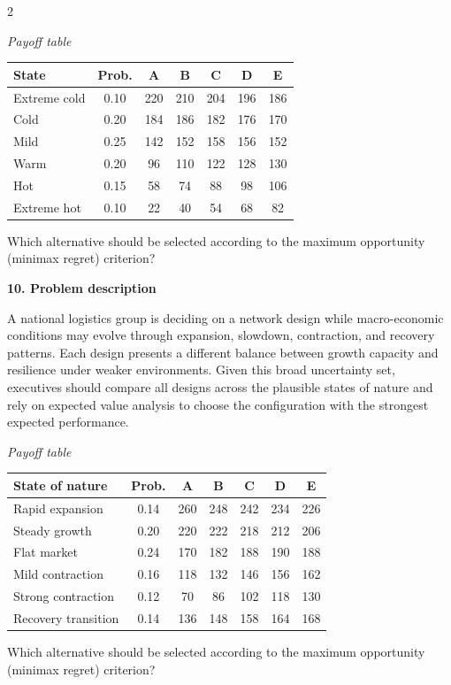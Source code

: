 \documentclass[12pt]{article}
\newcommand{\SubsectionBox}[1]{%
	\noindent\colorbox{gray!30}{%
		\parbox{\linewidth}{\textbf{#1}}%
	}\par\vspace{0.35cm}%
}
\begin{document}
\begin{multicols}{2}
				\begin{center}
					\textit{Payoff table}
					\begin{tabular}{l c c c c c c}
						\toprule
						State & Prob. & A & B & C & D & E \\
						\midrule
						Extreme cold & 0.10 & 220 & 210 & 204 & 196 & 186 \\
						Cold & 0.20 & 184 & 186 & 182 & 176 & 170 \\
						Mild & 0.25 & 142 & 152 & 158 & 156 & 152 \\
						Warm & 0.20 & 96 & 110 & 122 & 128 & 130 \\
						Hot & 0.15 & 58 & 74 & 88 & 98 & 106 \\
						Extreme hot & 0.10 & 22 & 40 & 54 & 68 & 82 \\
						\bottomrule
					\end{tabular}
				\end{center}
		
				Which alternative should be selected according to the maximum opportunity (minimax regret) criterion?

		\vspace{0.25cm}
		\SubsectionBox{10. Problem description}\vspace{-0.25cm}
		A national logistics group is deciding on a network design while macro-economic conditions may evolve through expansion, slowdown, contraction, and recovery patterns. Each design presents a different balance between growth capacity and resilience under weaker environments. Given this broad uncertainty set, executives should compare all designs across the plausible states of nature and rely on expected value analysis to choose the configuration with the strongest expected performance.
		
				\begin{center}
					\textit{Payoff table}
					\begin{tabular}{l c c c c c c}
						\toprule
						State of nature & Prob. & A & B & C & D & E \\
						\midrule
						Rapid expansion & 0.14 & 260 & 248 & 242 & 234 & 226 \\
						Steady growth & 0.20 & 220 & 222 & 218 & 212 & 206 \\
						Flat market & 0.24 & 170 & 182 & 188 & 190 & 188 \\
						Mild contraction & 0.16 & 118 & 132 & 146 & 156 & 162 \\
						Strong contraction & 0.12 & 70 & 86 & 102 & 118 & 130 \\
						Recovery transition & 0.14 & 136 & 148 & 158 & 164 & 168 \\
						\bottomrule
					\end{tabular}
				\end{center}
		
				Which alternative should be selected according to the maximum opportunity (minimax regret) criterion?

	\end{multicols}
\end{document}
